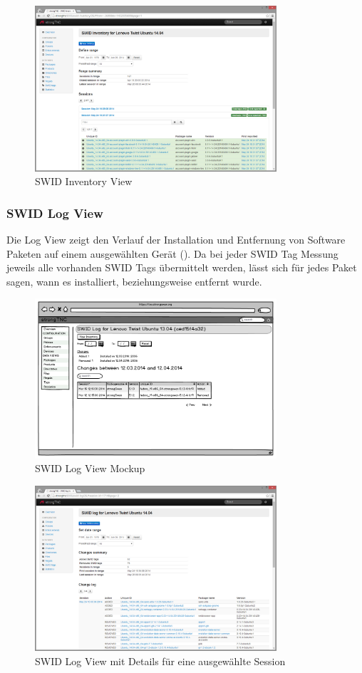 \begin{figure}[H]
\centering
\includegraphics[width=0.8\textwidth]{./images/Views/inventory-view}
\caption{SWID Inventory View}
\label{fig:tag-detail-view}
\end{figure}


\subsubsection{SWID Log View}

Die Log View zeigt den Verlauf der Installation und Entfernung von Software Paketen auf
einem ausgewählten Gerät (). Da bei jeder SWID Tag Messung jeweils alle
vorhanden SWID Tags übermittelt werden, lässt sich für jedes Paket sagen, wann
es installiert, beziehungsweise entfernt wurde. 

\begin{figure}[H]
\centering
\includegraphics[width=0.8\textwidth]{./images/mockups/swid-log}
\caption{SWID Log View Mockup}
\label{fig:swid-log}
\end{figure}

\begin{figure}[H]
\centering
\includegraphics[width=0.8\textwidth]{./images/Views/log-view}
\caption{SWID Log View mit Details für eine ausgewählte Session}
\label{fig:log-view}
\end{figure}